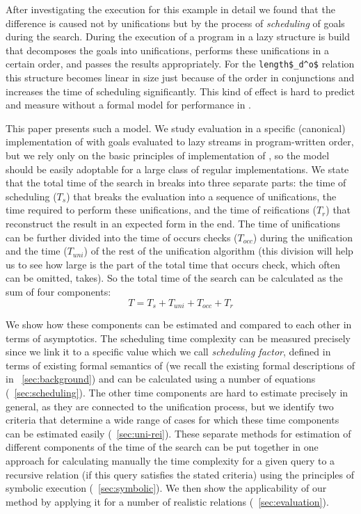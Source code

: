 After investigating the execution for this example in detail we found that the difference is caused not by unifications but by the process of \emph{scheduling} of goals during the search.
During the execution of a program in \mK a lazy structure is build that decomposes the goals into unifications, performs these unifications in a certain order, and passes the results
appropriately. For the \lstinline|length$_d^o$| relation this structure becomes linear in size just because of the order in conjunctions and increases the time of
scheduling significantly. This kind of effect is hard to predict and measure without a formal model for performance in \mK.

This paper presents such a model. We study evaluation in a specific (canonical) implementation of \mK with goals evaluated to lazy streams in program-written order, but we rely only on the basic principles of implementation of \mK, so the model should be easily adoptable for a large class of regular implementations. We state that the total time of the search in \mK breaks into three separate parts: the time of scheduling ($T_s$) that breaks the evaluation into a sequence of
unifications, the time required to perform these unifications, and the time of reifications ($T_r$) that reconstruct the result in an expected form in the end. The time of unifications can be further
divided into the time of occurs checks ($T_{occ}$) during the unification and the time ($T_{uni}$) of the rest of the unification algorithm (this division will help us to see how large
is the part of the total time that occurs check, which often can be omitted, takes). So the total time of the search can be calculated as the sum of four components:
\noindent
\[ T = T_s + T_{uni} + T_{occ} + T_r \]

We show how these components can be estimated and compared to each other in terms of asymptotics. The scheduling time complexity can be measured precisely since we link it to a specific value which we
call \emph{scheduling factor}, defined in terms of existing formal semantics of \mK (we recall the existing formal descriptions of \mK in \sectionword~\ref{sec:background}) and can be calculated using
a number of equations (\sectionword~\ref{sec:scheduling}). The other time components are hard to estimate precisely in general, as they are connected to the unification process, but we identify two
criteria that determine a wide range of cases for which these time components can be estimated easily (\sectionword~\ref{sec:uni-rei}). These separate methods for estimation of
different components of the time of the search can be put together in one approach for calculating manually the time complexity for a given query to a recursive relation (if this query satisfies the stated
criteria) using the principles of symbolic execution (\sectionword~\ref{sec:symbolic}). We then show the applicability of our method by applying it for a number of realistic \mK relations (\sectionword~\ref{sec:evaluation}).
